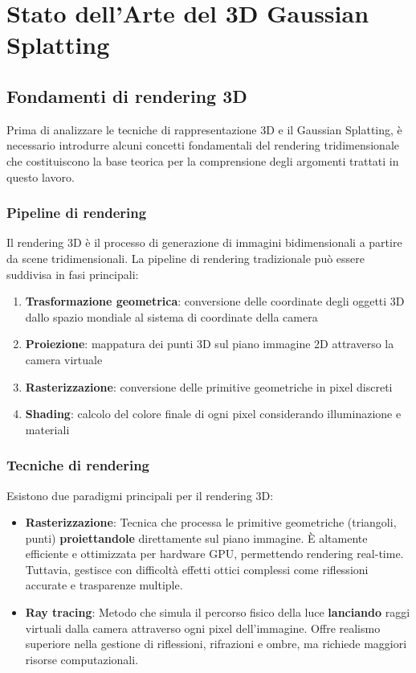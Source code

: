 \chapter{Stato dell'Arte del 3D Gaussian Splatting}
\label{chap:arte}

\section{Fondamenti di rendering 3D}

Prima di analizzare le tecniche di rappresentazione 3D e il Gaussian Splatting, è necessario introdurre alcuni concetti fondamentali del rendering tridimensionale che costituiscono la base teorica per la comprensione degli argomenti trattati in questo lavoro.

\subsection{Pipeline di rendering}

Il rendering 3D è il processo di generazione di immagini bidimensionali a partire da scene tridimensionali. La pipeline di rendering tradizionale può essere suddivisa in fasi principali:

\begin{enumerate}
    \item \textbf{Trasformazione geometrica}: conversione delle coordinate degli oggetti 3D dallo spazio mondiale al sistema di coordinate della camera
    \item \textbf{Proiezione}: mappatura dei punti 3D sul piano immagine 2D attraverso la camera virtuale
    \item \textbf{Rasterizzazione}: conversione delle primitive geometriche in pixel discreti
    \item \textbf{Shading}: calcolo del colore finale di ogni pixel considerando illuminazione e materiali
\end{enumerate}

\newpage  %
\subsection{Tecniche di rendering}

Esistono due paradigmi principali per il rendering 3D:

\begin{itemize}
	\item \textbf{Rasterizzazione}: Tecnica che processa le primitive geometriche (triangoli, punti) \textbf{proiettandole} direttamente sul piano immagine. È altamente efficiente e ottimizzata per hardware GPU, permettendo rendering real-time. Tuttavia, gestisce con difficoltà effetti ottici complessi come riflessioni accurate e trasparenze multiple.

\item \textbf{Ray tracing}: Metodo che simula il percorso fisico della luce \textbf{lanciando} raggi virtuali dalla camera attraverso ogni pixel dell'immagine. Offre realismo superiore nella gestione di riflessioni, rifrazioni e ombre, ma richiede maggiori risorse computazionali.
\end{itemize}

